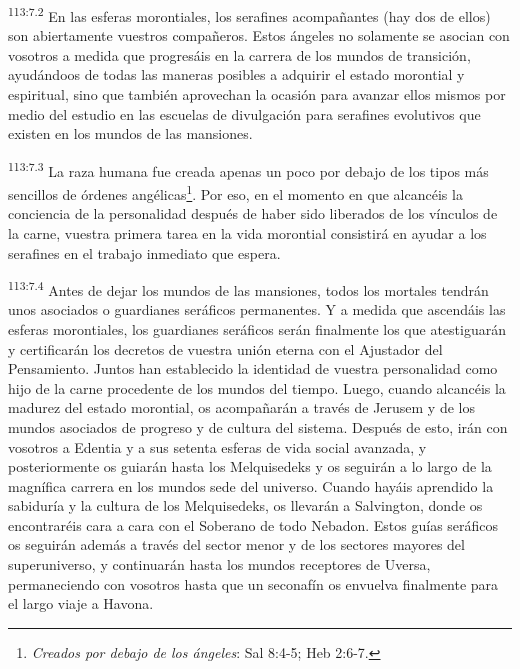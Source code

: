 \par
\textsuperscript{113:7.2} En las esferas morontiales, los serafines acompañantes (hay dos de ellos) son abiertamente vuestros compañeros. Estos ángeles no solamente se asocian con vosotros a medida que progresáis en la carrera de los mundos de transición, ayudándoos de todas las maneras posibles a adquirir el estado morontial y espiritual, sino que también aprovechan la ocasión para avanzar ellos mismos por medio del estudio en las escuelas de divulgación para serafines evolutivos que existen en los mundos de las mansiones.

\par
\textsuperscript{113:7.3} La raza humana fue creada apenas un poco por debajo de los tipos más sencillos de órdenes angélicas\footnote{\textit{Creados por debajo de los ángeles}: Sal 8:4-5; Heb 2:6-7.}. Por eso, en el momento en que alcancéis la conciencia de la personalidad después de haber sido liberados de los vínculos de la carne, vuestra primera tarea en la vida morontial consistirá en ayudar a los serafines en el trabajo inmediato que espera.

\par
\textsuperscript{113:7.4} Antes de dejar los mundos de las mansiones, todos los mortales tendrán unos asociados o guardianes seráficos permanentes. Y a medida que ascendáis las esferas morontiales, los guardianes seráficos serán finalmente los que atestiguarán y certificarán los decretos de vuestra unión eterna con el Ajustador del Pensamiento. Juntos han establecido la identidad de vuestra personalidad como hijo de la carne procedente de los mundos del tiempo. Luego, cuando alcancéis la madurez del estado morontial, os acompañarán a través de Jerusem y de los mundos asociados de progreso y de cultura del sistema. Después de esto, irán con vosotros a Edentia y a sus setenta esferas de vida social avanzada, y posteriormente os guiarán hasta los Melquisedeks y os seguirán a lo largo de la magnífica carrera en los mundos sede del universo. Cuando hayáis aprendido la sabiduría y la cultura de los Melquisedeks, os llevarán a Salvington, donde os encontraréis cara a cara con el Soberano de todo Nebadon. Estos guías seráficos os seguirán además a través del sector menor y de los sectores mayores del superuniverso, y continuarán hasta los mundos receptores de Uversa, permaneciendo con vosotros hasta que un seconafín os envuelva finalmente para el largo viaje a Havona.

